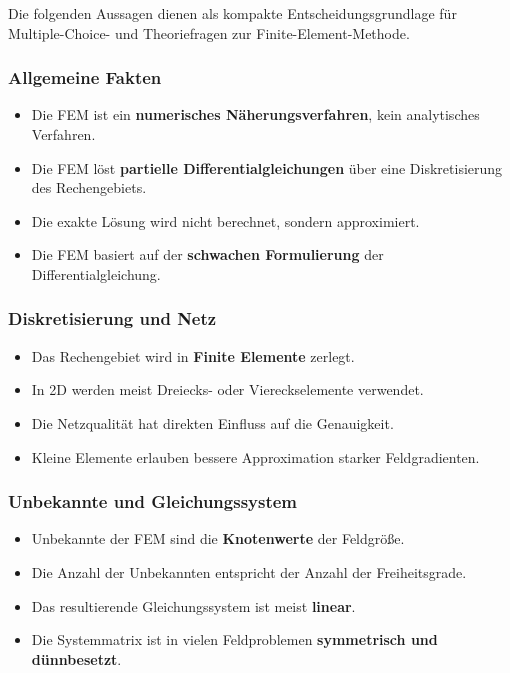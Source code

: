 \documentclass[a4paper]{article}
\begin{document}
Die folgenden Aussagen dienen als kompakte Entscheidungsgrundlage f\"ur Multiple-Choice- und Theoriefragen zur Finite-Element-Methode.

\subsubsection*{Allgemeine Fakten}

\begin{itemize}
    \item Die FEM ist ein \textbf{numerisches N\"aherungsverfahren}, kein analytisches Verfahren.
    \item Die FEM l\"ost \textbf{partielle Differentialgleichungen} \"uber eine Diskretisierung des Rechengebiets.
    \item Die exakte L\"osung wird nicht berechnet, sondern approximiert.
    \item Die FEM basiert auf der \textbf{schwachen Formulierung} der Differentialgleichung.
\end{itemize}

\subsubsection*{Diskretisierung und Netz}

\begin{itemize}
    \item Das Rechengebiet wird in \textbf{Finite Elemente} zerlegt.
    \item In 2D werden meist Dreiecks- oder Viereckselemente verwendet.
    \item Die Netzqualit\"at hat direkten Einfluss auf die Genauigkeit.
    \item Kleine Elemente erlauben bessere Approximation starker Feldgradienten.
\end{itemize}

\subsubsection*{Unbekannte und Gleichungssystem}

\begin{itemize}
    \item Unbekannte der FEM sind die \textbf{Knotenwerte} der Feldgr\"o\ss e.
    \item Die Anzahl der Unbekannten entspricht der Anzahl der Freiheitsgrade.
    \item Das resultierende Gleichungssystem ist meist \textbf{linear}.
    \item Die Systemmatrix ist in vielen Feldproblemen \textbf{symmetrisch und d\"unnbesetzt}.
\end{itemize}
\end{document}
